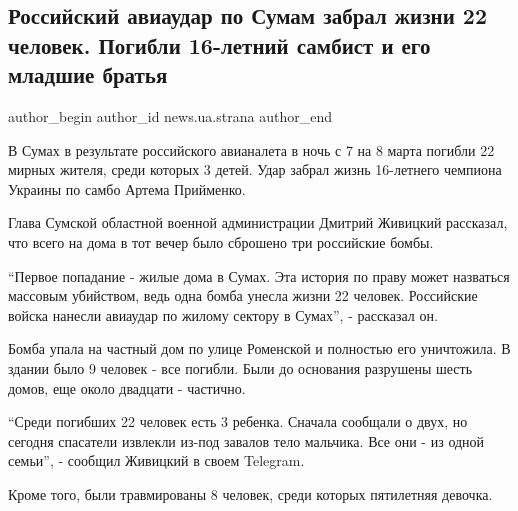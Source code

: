  
 
 
 
 
 
\subsection{Российский авиаудар по Сумам забрал жизни 22 человек. Погибли 16-летний самбист и его младшие братья}
\label{sec:09_03_2022.stz.news.ua.strana.1.aviaudar_sumy_sambo}
 
\ifcmt
 author_begin
   author_id news.ua.strana
 author_end
\fi

В Сумах в результате российского авианалета в ночь с 7 на 8 марта погибли 22
мирных жителя, среди которых 3 детей. Удар забрал жизнь 16-летнего чемпиона
Украины по самбо Артема Прийменко.


Глава Сумской областной военной администрации Дмитрий Живицкий рассказал, что
всего на дома в тот вечер было сброшено три российские бомбы. 

\enquote{Первое попадание - жилые дома в Сумах. Эта история по праву может
назваться массовым убийством, ведь одна бомба унесла жизни 22 человек.
Российские войска нанесли авиаудар по жилому сектору в Сумах}, - рассказал он.

Бомба упала на частный дом по улице Роменской и полностью его уничтожила. В
здании было 9 человек - все погибли. Были до основания разрушены шесть домов,
еще около двадцати - частично.

\enquote{Среди погибших 22 человек есть 3 ребенка. Сначала сообщали о двух, но
сегодня спасатели извлекли из-под завалов тело мальчика. Все они - из одной
семьи}, - сообщил Живицкий в своем Telegram.

Кроме того, были травмированы 8 человек, среди которых пятилетняя девочка.

